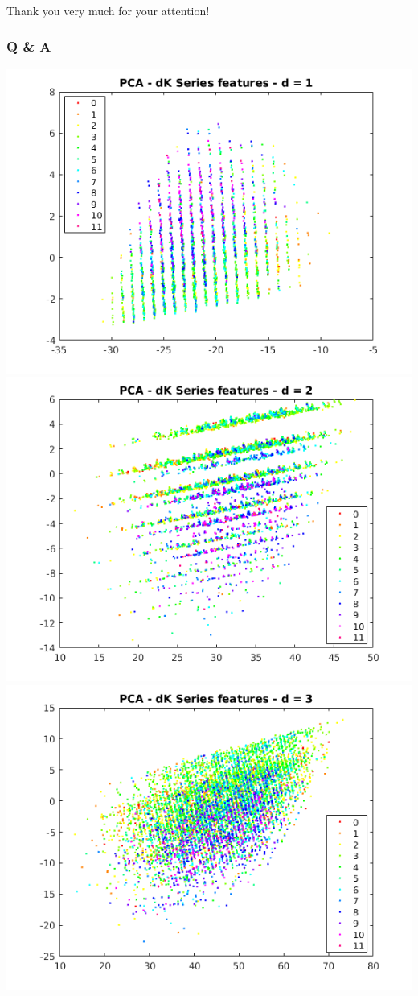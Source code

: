 \documentclass{beamer}
\begin{document}
\begin{frame}
\frametitle{}
\begin{center}
{\Large Thank you very much for your attention!}
\end{center}
\end{frame}

\begin{frame}
\frametitle{Q \& A}
\begin{justify}
\includegraphics[scale=0.2]{d1-PCA}
\includegraphics[scale=0.2]{d2-PCA}
\includegraphics[scale=0.2]{d3-PCA}

\end{justify}
\end{frame}
\end{document}
